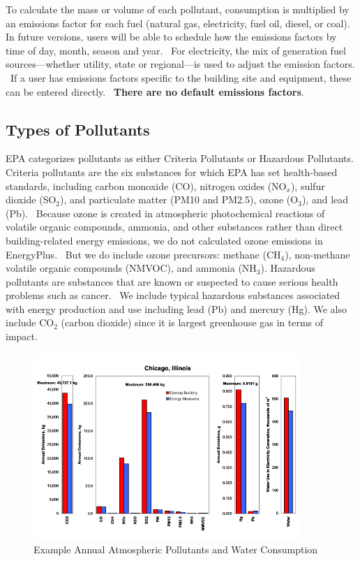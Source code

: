 To calculate the mass or volume of each pollutant, consumption is multiplied by an emissions factor for each fuel (natural gas, electricity, fuel oil, diesel, or coal). In future versions, users will be able to schedule how the emissions factors by time of day, month, season and year.~ For electricity, the mix of generation fuel sources---whether utility, state or regional---is used to adjust the emission factors. ~If a user has emissions factors specific to the building site and equipment, these can be entered directly.~ \textbf{There are no default emissions factors}.

\subsection{Types of Pollutants}\label{types-of-pollutants}

EPA categorizes pollutants as either Criteria Pollutants or Hazardous Pollutants. Criteria pollutants are the six substances for which EPA has set health-based standards, including carbon monoxide (CO), nitrogen oxides (NO\(_{x}\)), sulfur dioxide (SO\(_{2}\)), and particulate matter (PM10 and PM2.5), ozone (O\(_{3}\)), and lead (Pb).~ Because ozone is created in atmospheric photochemical reactions of volatile organic compounds, ammonia, and other substances rather than direct building-related energy emissions, we do not calculated ozone emissions in EnergyPlus.~ But we do include ozone precursors: methane (CH\(_{4}\)), non-methane volatile organic compounds (NMVOC), and ammonia (NH\(_{3}\)). Hazardous pollutants are substances that are known or suspected to cause serious health problems such as cancer.~ We include typical hazardous substances associated with energy production and use including lead (Pb) and mercury (Hg). We also include CO\(_{2}\) (carbon dioxide) since it is largest greenhouse gas in terms of impact.

\begin{figure}[hbtp] %
\centering
\includegraphics[width=0.9\textwidth, height=0.9\textheight, keepaspectratio=true]{media/image7910.svg.png}
\caption{  Example Annual Atmospheric Pollutants and Water Consumption \protect \label{fig:example-annual-atmospheric-pollutants}}
\end{figure}

